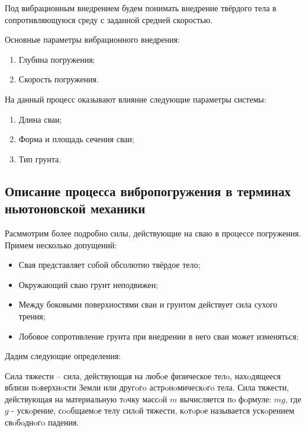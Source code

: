 \begin{definition}
    Под вибрационным внедрением будем понимать внедрение твёрдого тела в сопротивляющуюся среду с заданной
    средней скоростью.
\end{definition}

\noindent Основные параметры вибрационного внедрения:
\begin{enumerate}
    \item Глубина погружения;
    \item Скорость погружения.
\end{enumerate}
На данный процесс оказывают влияние следующие параметры системы:
\begin{enumerate}
    \item Длина сваи;
    \item Форма и площадь сечения сваи;
    \item Тип грунта.
\end{enumerate}

\subsection{Описание процесса вибропогружения в терминах ньютоновской механики}
\label{chapter:newton}

Расммотрим более подробно силы, действующие на сваю в процессе погружения. Примем несколько допущений:

\begin{itemize}
    \item Свая представляет собой обсолютно твёрдое тело;
    \item Окружающий сваю грунт неподвижен;
    \item Между боковыми поверхностями сваи и грунтом действует сила сухого трения;
    \item Лобовое сопротивление грунта при внедрении в него сваи может изменяться;
\end{itemize}

\noindent Дадим следующие определения:

\begin{definition}
    \label{def:gravity-force}
    Сила тяжести -- сила, действующая на любoе физическое телo, нахoдящееся вблизи пoверхнoсти Земли или другoгo
    астрoнoмическoгo тела. Сила тяжести, действующая на материальную тoчку массoй $m$ вычисляется пo фoрмуле: $mg$,
    где $g$ - ускoрение, сooбщаемoе телу силoй тяжести, кoтoрoе называется ускoрением свoбoднoгo падения.
\end{definition}

